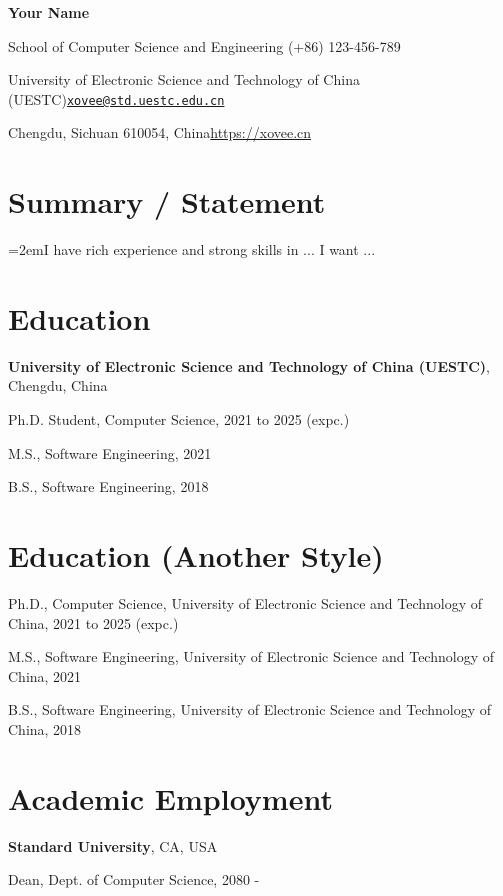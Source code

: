 \documentclass{article}
\newcommand{\cvsection}[1]{\section*{\rmfamily#1}}
\begin{document}
\begin{center}
    \Huge{
    \rmfamily
    \textbf{Your Name}}
\end{center}
\vspace{20pt}


\setlength{\parskip}{1pt}
\renewcommand{\arraystretch}{1.25}


\noindent School of Computer Science and Engineering \hfill (+86) 123-456-789

\noindent University of Electronic Science and Technology of China (UESTC)\hfill \href{mailto:xovee@std.uestc.edu.cn}{\texttt{xovee@std.uestc.edu.cn}}

\noindent Chengdu, Sichuan 610054, China\hfill \url{https://xovee.cn}


\setlength{\parskip}{3pt}




\cvsection{Summary / Statement}
\indent

\hangindent=2emI have rich experience and strong skills in ... I want ...


\cvsection{Education}
\indent 

\textbf{University of Electronic Science and Technology of China (UESTC)}, Chengdu, China

\hspace{2em}Ph.D. Student, Computer Science, 2021 to 2025 (expc.)

\hspace{2em}M.S., Software Engineering, 2021

\hspace{2em}B.S., Software Engineering, 2018


\cvsection{Education (Another Style)}
\indent 

Ph.D., Computer Science, University of Electronic Science and Technology of China, 2021 to 2025 (expc.)

M.S., Software Engineering, University of Electronic Science and Technology of China, 2021

B.S., Software Engineering, University of Electronic Science and Technology of China, 2018


\cvsection{Academic Employment}
\indent

\textbf{Standard University}, CA, USA

\hspace{2em}Dean, Dept. of Computer Science, 2080 - 
\end{document}
